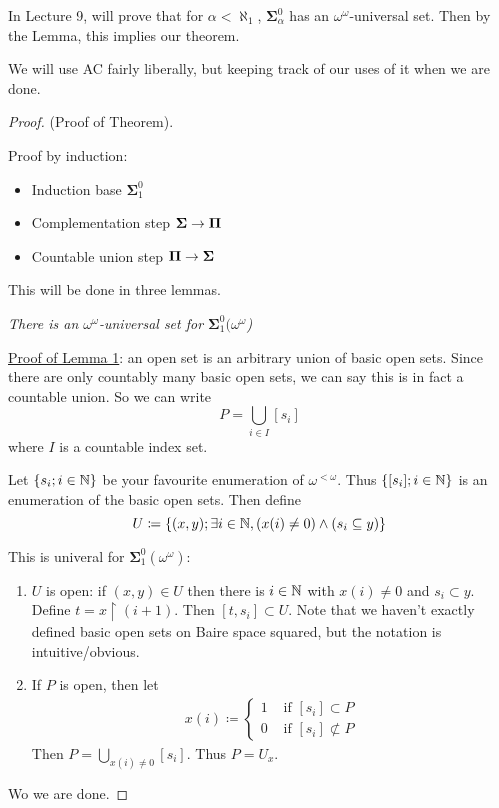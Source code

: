 \documentclass[]{article}
\newcommand{\om}{\omega}
\newcommand{\lom}{{<\omega}}
\newcommand{\bosig}{\bm{\Sigma}}
\newcommand{\bopi}{\bm{\Pi}}
\begin{document}
In Lecture 9, will prove that for $\alpha < \aleph_1$, $\bosig_\alpha^0$ has an $\om^\om$-universal set. Then by the Lemma, this implies our theorem.


We will use AC fairly liberally, but keeping track of our uses of it when we are done.

\begin{proof} (Proof of Theorem).
    
    Proof by induction:
    \begin{itemize}
        \item Induction base $\bosig_1^0$
        \item Complementation step $\bosig \ra \bopi$
        \item Countable union step $\bopi \ra \bosig$
    \end{itemize}
    This will be done in three lemmas.

    \begin{remark*}[Lemma 1]\emph{
        There is an $\om^\om$-universal set for $\bosig_1^0(\om^\om$)
    }   
    \end{remark*}

    \underline{Proof of Lemma 1}: an open set is an arbitrary union of basic open sets. Since there are only countably many basic open sets, we can say this is in fact a countable union. So we can write $$P = \bigcup_{i\in I}[s_i]$$ where $I$ is a countable index set.

    Let $\{s_i ; i \in \mathbb{N}\}$ be your favourite enumeration of $\om^\lom$. Thus $\{[s_i];i\in\mathbb{N}\}$ is an enumeration of the basic open sets. Then define $$U\coloneqq \{(x,y); \exists i \in \mathbb{N}, (x(i)\ne 0)\land (s_i\subseteq y)\}$$

    This is univeral for $\bosig_1^0(\om^\om)$:
    \begin{enumerate}
        \item $U$ is open: if $(x,y)\in U$ then there is $i\in \mathbb{N}$ with $x(i)\ne 0$ and $s_i\subset y$. Define $t = x\restriction (i+1)$. Then $[t,s_i]\subset U$. Note that we haven't exactly defined basic open sets on Baire space squared, but the notation is intuitive/obvious.
        \item If $P$ is open, then let
        \begin{align*}
            x(i)\coloneqq \left\lbrace \begin{array}{cc} 1 & \textrm{ if }[s_i]\subset P\\ 0 & \textrm{ if }[s_i]\not\subset P\end{array}\right.
        \end{align*}
        Then $P = \bigcup_{x(i)\ne 0}[s_i]$. Thus $P = U_x$.
    \end{enumerate}
    Wo we are done. \qedhere


\end{proof}
\end{document}
